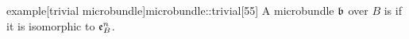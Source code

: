 
\begin{mystatement}{example}[trivial
microbundle]{microbundle::trivial}[55]
A microbundle $\bb$ over $B$ is  if it is isomorphic to $\mathfrak{e}^{n}_{B}$.
\end{mystatement}
